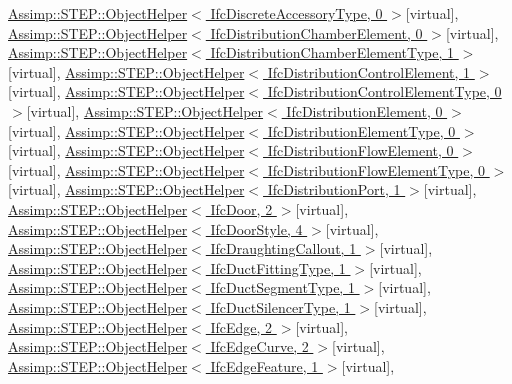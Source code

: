 \hyperlink{struct_assimp_1_1_s_t_e_p_1_1_object_helper}{Assimp\+::\+S\+T\+E\+P\+::\+Object\+Helper$<$ Ifc\+Discrete\+Accessory\+Type, 0 $>$}{\ttfamily  \mbox{[}virtual\mbox{]}}, \hyperlink{struct_assimp_1_1_s_t_e_p_1_1_object_helper}{Assimp\+::\+S\+T\+E\+P\+::\+Object\+Helper$<$ Ifc\+Distribution\+Chamber\+Element, 0 $>$}{\ttfamily  \mbox{[}virtual\mbox{]}}, \hyperlink{struct_assimp_1_1_s_t_e_p_1_1_object_helper}{Assimp\+::\+S\+T\+E\+P\+::\+Object\+Helper$<$ Ifc\+Distribution\+Chamber\+Element\+Type, 1 $>$}{\ttfamily  \mbox{[}virtual\mbox{]}}, \hyperlink{struct_assimp_1_1_s_t_e_p_1_1_object_helper}{Assimp\+::\+S\+T\+E\+P\+::\+Object\+Helper$<$ Ifc\+Distribution\+Control\+Element, 1 $>$}{\ttfamily  \mbox{[}virtual\mbox{]}}, \hyperlink{struct_assimp_1_1_s_t_e_p_1_1_object_helper}{Assimp\+::\+S\+T\+E\+P\+::\+Object\+Helper$<$ Ifc\+Distribution\+Control\+Element\+Type, 0 $>$}{\ttfamily  \mbox{[}virtual\mbox{]}}, \hyperlink{struct_assimp_1_1_s_t_e_p_1_1_object_helper}{Assimp\+::\+S\+T\+E\+P\+::\+Object\+Helper$<$ Ifc\+Distribution\+Element, 0 $>$}{\ttfamily  \mbox{[}virtual\mbox{]}}, \hyperlink{struct_assimp_1_1_s_t_e_p_1_1_object_helper}{Assimp\+::\+S\+T\+E\+P\+::\+Object\+Helper$<$ Ifc\+Distribution\+Element\+Type, 0 $>$}{\ttfamily  \mbox{[}virtual\mbox{]}}, \hyperlink{struct_assimp_1_1_s_t_e_p_1_1_object_helper}{Assimp\+::\+S\+T\+E\+P\+::\+Object\+Helper$<$ Ifc\+Distribution\+Flow\+Element, 0 $>$}{\ttfamily  \mbox{[}virtual\mbox{]}}, \hyperlink{struct_assimp_1_1_s_t_e_p_1_1_object_helper}{Assimp\+::\+S\+T\+E\+P\+::\+Object\+Helper$<$ Ifc\+Distribution\+Flow\+Element\+Type, 0 $>$}{\ttfamily  \mbox{[}virtual\mbox{]}}, \hyperlink{struct_assimp_1_1_s_t_e_p_1_1_object_helper}{Assimp\+::\+S\+T\+E\+P\+::\+Object\+Helper$<$ Ifc\+Distribution\+Port, 1 $>$}{\ttfamily  \mbox{[}virtual\mbox{]}}, \hyperlink{struct_assimp_1_1_s_t_e_p_1_1_object_helper}{Assimp\+::\+S\+T\+E\+P\+::\+Object\+Helper$<$ Ifc\+Door, 2 $>$}{\ttfamily  \mbox{[}virtual\mbox{]}}, \hyperlink{struct_assimp_1_1_s_t_e_p_1_1_object_helper}{Assimp\+::\+S\+T\+E\+P\+::\+Object\+Helper$<$ Ifc\+Door\+Style, 4 $>$}{\ttfamily  \mbox{[}virtual\mbox{]}}, \hyperlink{struct_assimp_1_1_s_t_e_p_1_1_object_helper}{Assimp\+::\+S\+T\+E\+P\+::\+Object\+Helper$<$ Ifc\+Draughting\+Callout, 1 $>$}{\ttfamily  \mbox{[}virtual\mbox{]}}, \hyperlink{struct_assimp_1_1_s_t_e_p_1_1_object_helper}{Assimp\+::\+S\+T\+E\+P\+::\+Object\+Helper$<$ Ifc\+Duct\+Fitting\+Type, 1 $>$}{\ttfamily  \mbox{[}virtual\mbox{]}}, \hyperlink{struct_assimp_1_1_s_t_e_p_1_1_object_helper}{Assimp\+::\+S\+T\+E\+P\+::\+Object\+Helper$<$ Ifc\+Duct\+Segment\+Type, 1 $>$}{\ttfamily  \mbox{[}virtual\mbox{]}}, \hyperlink{struct_assimp_1_1_s_t_e_p_1_1_object_helper}{Assimp\+::\+S\+T\+E\+P\+::\+Object\+Helper$<$ Ifc\+Duct\+Silencer\+Type, 1 $>$}{\ttfamily  \mbox{[}virtual\mbox{]}}, \hyperlink{struct_assimp_1_1_s_t_e_p_1_1_object_helper}{Assimp\+::\+S\+T\+E\+P\+::\+Object\+Helper$<$ Ifc\+Edge, 2 $>$}{\ttfamily  \mbox{[}virtual\mbox{]}}, \hyperlink{struct_assimp_1_1_s_t_e_p_1_1_object_helper}{Assimp\+::\+S\+T\+E\+P\+::\+Object\+Helper$<$ Ifc\+Edge\+Curve, 2 $>$}{\ttfamily  \mbox{[}virtual\mbox{]}}, \hyperlink{struct_assimp_1_1_s_t_e_p_1_1_object_helper}{Assimp\+::\+S\+T\+E\+P\+::\+Object\+Helper$<$ Ifc\+Edge\+Feature, 1 $>$}{\ttfamily  \mbox{[}virtual\mbox{]}}, 